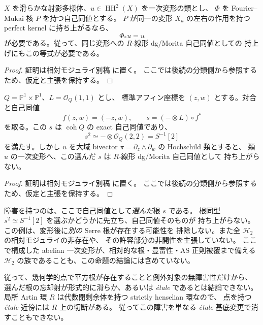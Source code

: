\begin{lemma}[自己同値を持ち上げるための必要条件]
\label{lem:autoequivalence-deformation-obstruction}
$X$ を滑らかな射影多様体、$u\in\operatorname{HH}^2(X)$ を一次変形の類とし、
$\Phi$ を Fourier--Mukai 核 $P$ を持つ自己同値とする。
$P$ が同一の変形 $X_u$ の左右の作用を持つ perfect kernel に持ち上がるなら、
\[
 \Phi_*u=u
\]
が必要である。従って、同じ変形への $R$-線形 dg/Morita 自己同値としての
持上げにもこの等式が必要である。
\end{lemma}

\begin{proof}
証明は相対モジュライ別稿 \cite[\texttt{foundation_stack} 節]{QuadricModuli2026} に置く。
ここでは後続の分類側から参照するため、仮定と主張を保持する。
\end{proof}

\begin{proposition}
\label{prop:chosen-root-does-not-lift}
$Q=\mathbb P^1\times\mathbb P^1$、$L=\mathcal O_Q(1,1)$ とし、
標準アフィン座標を $(z,w)$ とする。対合と自己同値
\[
 f(z,w)=(-z,w),\qquad s=(-\otimes L)\circ f^*
\]
を取る。この $s$ は $\operatorname{coh}Q$ の exact 自己同値であり、
\[
 s^2\simeq-\otimes\mathcal O_Q(2,2)=S^{-1}[2]
\]
を満たす。しかし $u$ を大域 bivector
$\pi=\partial_z\wedge\partial_w$ の Hochschild 類とすると、
類 $u$ の一次変形へ、この選んだ $s$ は $R$-線形 dg/Morita 自己同値として
持ち上がらない。
\end{proposition}

\begin{proof}
証明は相対モジュライ別稿 \cite[\texttt{foundation_stack} 節]{QuadricModuli2026} に置く。
ここでは後続の分類側から参照するため、仮定と主張を保持する。
\end{proof}

\begin{remark}[結論の範囲]
障害を持つのは、ここで自己同値として\emph{選んだ}根 $s$ である。
根同型 $s^2\simeq S^{-1}[2]$ を選ぶかどうかに先立ち、自己同値そのものが
持ち上がらない。この例は、変形後に\emph{別の} Serre 根が存在する可能性を
排除しない。また全 $\mathcal H_2$ の相対モジュライの非存在や、
その許容部分の非開性を主張していない。
ここで構成した abelian 一次変形が、相対的な根・豊富性・AS 正則被覆まで備える
$\mathcal H_2$ の族であることも、この命題の結論には含めていない。

従って、幾何学的点で平方根が存在することと例外対象の無障害性だけから、
選んだ根の忘却射が形式的に滑らか、あるいは \emph{\'etale} であるとは結論できない。
局所 Artin 環 $R$ は代数閉剰余体を持つ strictly henselian 環なので、
点を持つ \emph{\'etale} 近傍には $R$ 上の切断がある。
従ってこの障害を単なる \emph{\'etale} 基底変更で消すこともできない。
\end{remark}
